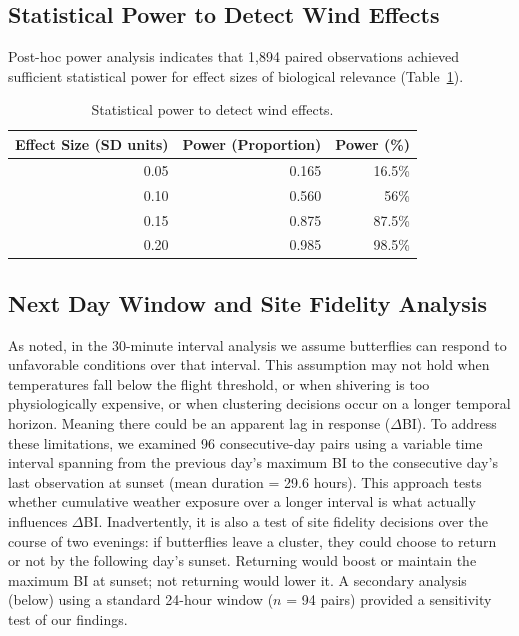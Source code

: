 \documentclass[insects,article,submit,pdftex,moreauthors]{Definitions/mdpi}
\begin{document}
\subsection{Statistical Power to Detect Wind Effects}

Post-hoc power analysis indicates that 1,894 paired observations achieved sufficient statistical power for effect sizes of biological relevance (Table~\ref{tab:power_analysis}).

\begin{table}[H]
\caption{Statistical power to detect wind effects.}
\label{tab:power_analysis}
\centering
\small
\begin{tabular}{rrr}
\toprule
\textbf{Effect Size (SD units)} & \textbf{Power (Proportion)} & \textbf{Power (\%)} \\
\midrule
0.05 & 0.165 & 16.5\% \\
0.10 & 0.560 & 56\% \\
0.15 & 0.875 & 87.5\% \\
0.20 & 0.985 & 98.5\% \\
\bottomrule
\end{tabular}
\end{table}

\subsection{Next Day Window and Site Fidelity Analysis}

As noted, in the 30-minute interval analysis we assume butterflies can respond to unfavorable conditions over that interval. This assumption may not hold when temperatures fall below the flight threshold, or when shivering is too physiologically expensive, or when clustering decisions occur on a longer temporal horizon. Meaning there could be an apparent lag in response ($\Delta$BI). To address these limitations, we examined 96 consecutive-day pairs using a variable time interval spanning from the previous day's maximum BI to the consecutive day's last observation at sunset (mean duration = 29.6 hours). This approach tests whether cumulative weather exposure over a longer interval is what actually influences $\Delta$BI. Inadvertently, it is also a test of site fidelity decisions over the course of two evenings: if butterflies leave a cluster, they could choose to return or not by the following day's sunset. Returning would boost or maintain the maximum BI at sunset; not returning would lower it. A secondary analysis (below) using a standard 24-hour window ($n$ = 94 pairs) provided a sensitivity test of our findings.
\end{document}

